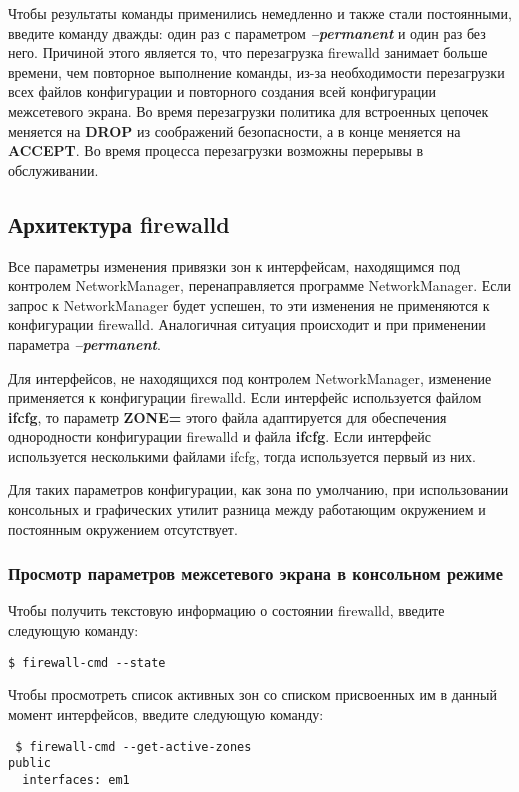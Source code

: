 \documentclass[a4paper,10pt,twoside]{article}
\begin{document}
Чтобы результаты команды применились немедленно и также стали постоянными, введите команду дважды: один раз с параметром \textit{\textbf{--permanent}} и один раз без него. Причиной этого является то, что перезагрузка firewalld занимает больше времени, чем повторное выполнение команды, из-за необходимости перезагрузки всех файлов конфигурации и повторного создания всей конфигурации межсетевого экрана. Во время перезагрузки политика для встроенных цепочек меняется на \textbf{DROP} из соображений безопасности, а в конце меняется на \textbf{ACCEPT}. Во время процесса перезагрузки возможны перерывы в обслуживании.



\subsection{Архитектура firewalld}

Все параметры изменения привязки зон к интерфейсам, находящимся под контролем NetworkManager, перенаправляется программе NetworkManager. Если запрос к NetworkManager будет успешен, то эти изменения не применяются к конфигурации firewalld.  Аналогичная ситуация происходит и при применении параметра \textit{\textbf{--permanent}}.

Для интерфейсов, не находящихся под контролем NetworkManager, изменение применяется к конфигурации firewalld. Если интерфейс используется файлом \textbf{ifcfg}, то параметр \textbf{ZONE=} этого файла адаптируется для обеспечения однородности конфигурации firewalld и файла \textbf{ifcfg}. Если интерфейс используется несколькими файлами ifcfg, тогда используется первый из них.

Для таких параметров конфигурации, как зона по умолчанию, при использовании консольных и графических утилит разница между работающим окружением и постоянным окружением отсутствует.


\subsubsection{Просмотр параметров межсетевого экрана в консольном режиме}

Чтобы получить текстовую информацию о состоянии firewalld, введите следующую команду:
\begin{verbatim}
$ firewall-cmd --state
\end{verbatim} 

Чтобы просмотреть список активных зон со списком присвоенных им в данный момент интерфейсов, введите следующую команду: 
\begin{verbatim}
 $ firewall-cmd --get-active-zones
public
  interfaces: em1
\end{verbatim} 
\end{document}
